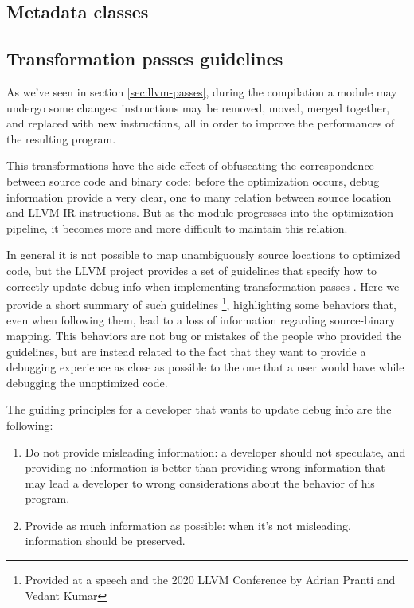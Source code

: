 \subsection{Metadata classes}
\subsection{Transformation passes guidelines}
As we've seen in section \ref{sec:llvm-passes}, during the compilation a module may undergo some changes: instructions may be removed, moved, merged together, and replaced with new instructions, all in order to improve the performances of the resulting program. \par 
This transformations have the side effect of obfuscating the correspondence between source code and binary code: before the optimization occurs, debug information provide a very clear, one to many relation between source location and LLVM-IR instructions. But as the module progresses into the optimization pipeline, it becomes more and more difficult to maintain this relation. \par
In general it is not possible to map unambiguously source locations to optimized code, but the LLVM project provides a set of guidelines that specify how to correctly update debug info when implementing transformation passes \cite{llvm-guidelines}. \newline
Here we provide a short summary of such guidelines \footnote{Provided at a speech and the 2020 LLVM Conference by Adrian Pranti and Vedant Kumar}, highlighting some behaviors that, even when following them, lead to a loss of information regarding source-binary mapping. This behaviors are not bug or mistakes of the people who provided the guidelines, but are instead related to the fact that they want to provide a debugging experience as close as possible to the one that a user would have while debugging the unoptimized code. \par 
The guiding principles for a developer that wants to update debug info are the following:
\begin{enumerate}
\item Do not provide misleading information: a developer should not speculate, and providing no information is better than providing wrong information that may lead a developer to wrong considerations about the behavior of his program.
\item Provide as much information as possible: when it's not misleading, information should be preserved. 
\end{enumerate}
